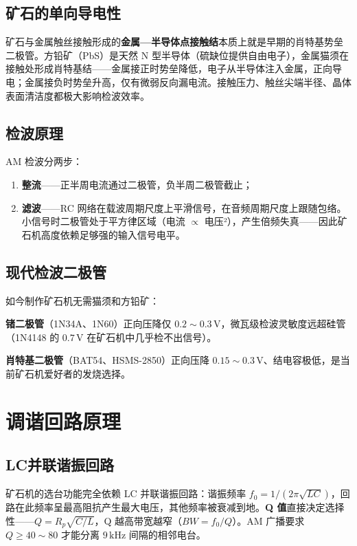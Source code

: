 \documentclass[12pt,UTF8]{ctexbook}
\begin{document}
\subsection{矿石的单向导电性}

矿石与金属触丝接触形成的\textbf{金属—半导体点接触结}本质上就是早期的肖特基势垒二极管。方铅矿（PbS）是天然 N 型半导体（硫缺位提供自由电子），金属猫须在接触处形成肖特基结——金属接正时势垒降低，电子从半导体注入金属，正向导电；金属接负时势垒升高，仅有微弱反向漏电流。接触压力、触丝尖端半径、晶体表面清洁度都极大影响检波效率。

\subsection{检波原理}

AM 检波分两步：
\begin{enumerate}
\item \textbf{整流}——正半周电流通过二极管，负半周二极管截止；
\item \textbf{滤波}——RC 网络在载波周期尺度上平滑信号，在音频周期尺度上跟随包络。小信号时二极管处于平方律区域（电流 $\propto$ 电压²），产生倍频失真——因此矿石机高度依赖足够强的输入信号电平。
\end{enumerate}

\subsection{现代检波二极管}

如今制作矿石机无需猫须和方铅矿：

\textbf{锗二极管}（1N34A、1N60）正向压降仅 $0.2\sim0.3\,\mathrm{V}$，微瓦级检波灵敏度远超硅管（1N4148 的 $0.7\,\mathrm{V}$ 在矿石机中几乎检不出信号）。

\textbf{肖特基二极管}（BAT54、HSMS-2850）正向压降 $0.15\sim0.3\,\mathrm{V}$、结电容极低，是当前矿石机爱好者的发烧选择。

\section{调谐回路原理}
\label{sec:crystal_tuning}

\subsection{LC并联谐振回路}

矿石机的选台功能完全依赖 LC 并联谐振回路：谐振频率 $f_0 = 1/(2\pi\sqrt{LC})$，回路在此频率呈最高阻抗产生最大电压，其他频率被衰减到地。\textbf{Q 值}直接决定选择性——$Q = R_p\sqrt{C/L}$，Q 越高带宽越窄（$BW = f_0/Q$）。AM 广播要求 $Q \ge 40\sim80$ 才能分离 $9\,\mathrm{kHz}$ 间隔的相邻电台。
\end{document}
